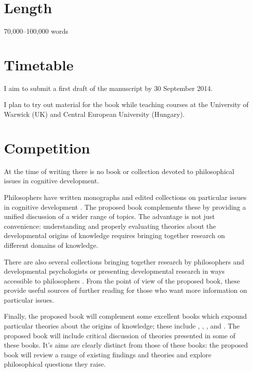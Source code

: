 \documentclass[12pt,\papersize]{extarticle}
\begin{document}
\section{Length}
70,000--100,000 words


\section{Timetable}
I aim to submit a first draft of the manuscript by 30 September 2014.  

I plan to try out material for the book while teaching courses at the University of Warwick (UK) and Central European University (Hungary).



\section{Competition}
At the time of writing there is no book or collection devoted to philosophical issues in cognitive development.

Philosophers have written monographs and edited collections on particular issues in cognitive development \citep[e.g.][]{Bermudez:2003dj,carruthers:1996_theories}.  
The proposed book complements these by providing a unified discussion of a wider range of topics. 
The advantage is not just convenience: understanding and properly evaluating theories about the developmental origins of knowledge requires bringing together research on different domains of knowledge.

There are also several collections bringing together research by philosophers and developmental psychologists or presenting developmental research in ways accessible to philosophers 
\citep[e.g.][]{hirschfeld:1994_mapping,carruthers:2005_innate_structure,carruthers:2006_innate_culture,mccormack:2011_tool}.
From the point of view of the proposed book, these provide useful sources of further reading for those who want more information on particular issues.

Finally, the proposed book will complement some excellent books which expound particular theories about the origins of knowledge; these include 
	\citet{carey:2009_origin},
	\citet{Tomasello:1999xz},
	\citet{Gopnik:1997xq},
	and
	\citet{Elman:1996zd}.
The proposed book will include critical discussion of theories presented in some of these  books.  
It's aims are clearly distinct from those of these books: the proposed book will review a range of existing findings and theories and explore philosophical questions they raise.  
\end{document}
